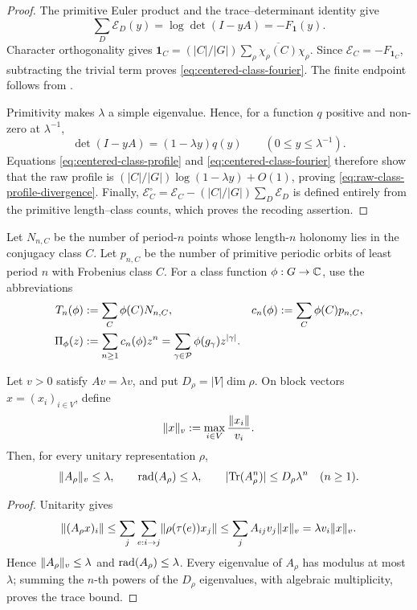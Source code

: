 \begin{proof}
The primitive Euler product and the trace--determinant identity give
\[
 \sum_D\mathcal E_D(y)=\log\det(I-yA)=-F_{\mathbf1}(y).
\]
Character orthogonality gives
\(\mathbf1_C=(|C|/|G|)\sum_\rho
\overline{\chi_\rho(C)}\chi_\rho\).  Since
\(\mathcal E_C=-F_{\mathbf1_C}\), subtracting the trivial term proves
\eqref{eq:centered-class-fourier}.  The finite endpoint follows from
.

Primitivity makes \(\lambda\) a simple eigenvalue.  Hence, for a function
\(q\) positive and non-zero at \(\lambda^{-1}\),
\[
 \det(I-yA)=(1-\lambda y)q(y)
 \qquad(0\le y\le\lambda^{-1}).
\]
Equations \eqref{eq:centered-class-profile} and
\eqref{eq:centered-class-fourier} therefore show that the raw profile is
\((|C|/|G|)\log(1-\lambda y)+O(1)\), proving
\eqref{eq:raw-class-profile-divergence}.  Finally,
\(\mathcal E_C^\circ=\mathcal E_C-(|C|/|G|)\sum_D\mathcal E_D\)
is defined entirely from the primitive length--class counts, which proves the
recoding assertion.
\end{proof}

Let \(N_{n,C}\) be the number of period-\(n\) points whose length-\(n\)
holonomy lies in the conjugacy class \(C\).  Let \(p_{n,C}\) be the number of
primitive periodic orbits of least period \(n\) with Frobenius class \(C\).
For a class function \(\phi:G\to\mathbb{C}\), use the abbreviations
\begin{align}
  T_n(\phi)&:=\sum_C\phi(C)N_{n,C},
  &c_n(\phi)&:=\sum_C\phi(C)p_{n,C},\label{eq:weighted-counts}\\
  \Pi_\phi(z)&:=\sum_{n\geq1}c_n(\phi)z^n
  =\sum_{\gamma\in\mathcal P}\phi(g_\gamma)z^{|\gamma|}.
  \label{eq:primitive-channel}
\end{align}

\begin{lemma}
\label{lem:perron-weighted-domination}
Let \(v>0\) satisfy \(Av=\lambda v\), and put
\(D_\rho=|V|\dim\rho\).  On block vectors \(x=(x_i)_{i\in V}\), define
\[
  \lVert x \rVert_v:=\max_{i\in V}\frac{\lVert x_i \rVert}{v_i}.
\]
Then, for every unitary representation \(\rho\),
\begin{equation}\label{eq:perron-weighted-block-bound}
  \lVert A_\rho \rVert_v\le\lambda,
  \qquad \operatorname{rad}(A_\rho)\le\lambda,
  \qquad \lvert \operatorname{Tr}(A_\rho^n) \rvert\le D_\rho\lambda^n
  \quad(n\ge1).
\end{equation}
\end{lemma}

\begin{proof}
Unitarity gives
\[
 \lVert (A_\rho x)_i \rVert
 \le \sum_j\sum_{e:i\to j}\lVert \rho(\tau(e))x_j \rVert
 \le \sum_j A_{ij}v_j\lVert x \rVert_v
 =\lambda v_i\lVert x \rVert_v.
\]
Hence \(\lVert A_\rho \rVert_v\le\lambda\) and
\(\operatorname{rad}(A_\rho)\le\lambda\).  Every eigenvalue of \(A_\rho\) has modulus at
most \(\lambda\); summing the \(n\)-th powers of the \(D_\rho\) eigenvalues,
with algebraic multiplicity, proves the trace bound.
\end{proof}

